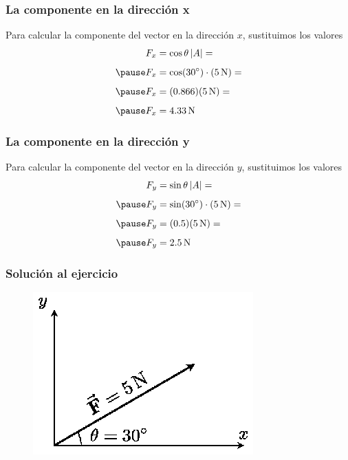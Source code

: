 \documentclass[14pt]{beamer}
\begin{document}
\begin{frame}
\frametitle{La componente en la dirección x}
Para calcular la componente del vector en la dirección $x$, sustituimos los valores 
\pause
\begin{eqnarray*}
\begin{aligned}
F_{x} &= \cos \theta \, \abs{A} =  \\[0.5em] \pause
F_{x} &= \cos (\ang{30}) \cdot (\SI{5}{\newton}) =  \\[0.5em] \pause
F_{x} &= (0.866) (\SI{5}{\newton}) =  \\[0.5em] \pause
F_{x} &= \SI{4.33}{\newton}
\end{aligned}
\end{eqnarray*}
\end{frame}    
\begin{frame}
\frametitle{La componente en la dirección y}
Para calcular la componente del vector en la dirección $y$, sustituimos los valores 
\pause
\begin{eqnarray*}
\begin{aligned}
F_{y} &= \sin \theta \, \abs{A} =  \\[0.5em] \pause
F_{y} &= \sin (\ang{30}) \cdot (\SI{5}{\newton}) =  \\[0.5em] \pause
F_{y} &= (0.5) (\SI{5}{\newton}) =  \\[0.5em] \pause
F_{y} &= \SI{2.5}{\newton}
\end{aligned}
\end{eqnarray*}
\end{frame}
\begin{frame}
\frametitle{Solución al ejercicio}
\begin{figure}
    \centering
    \includegraphics[scale=1.2]{Imagenes/Componentes_Vector_04.eps}
\end{figure}
\end{frame}
\end{document}
